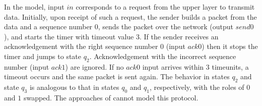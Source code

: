 In the model, input $\mathit{in}$ corresponds to a request from the upper layer to transmit data.
Initially, upon receipt of such a request, the sender builds a packet from the data and a sequence number $0$,
sends the packet over the network (output $\mathit{send0}$), and starts the timer with timeout value $3$.
If the sender receives an acknowledgement with the right sequence number $0$ (input $\mathit{ack0}$) 
then it stops the timer and jumps to state $q_2$.
Acknowledgement with the incorrect sequence number (input $\mathit{ack1}$) are ignored.
If no $\mathit{ack0}$ input arrives within $3$ timeunits, a timeout occurs and the same packet is sent again.
The behavior in states $q_2$ and state $q_3$ is analogous to that in states $q_0$ and $q_1$, respectively,
with the roles of $0$ and $1$ swapped.
\fi
The approaches of \cite{MensM15,CCF16} cannot model this protocol.

